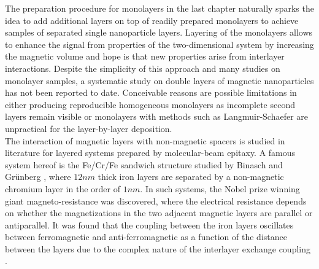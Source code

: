 \documentclass[\main/dresen_thesis.tex]{subfiles}
\begin{document}
  The preparation procedure for monolayers in the last chapter naturally sparks the idea to add additional layers on top of readily prepared monolayers to achieve samples of separated single nanoparticle layers.
  Layering of the monolayers allows to enhance the signal from properties of the two-dimensional system by increasing the magnetic volume and hope is that new properties arise from interlayer interactions.
  Despite the simplicity of this approach and many studies on monolayer samples, a systematic study on double layers of magnetic nanoparticles has not been reported to date.
  Conceivable reasons are possible limitations in either producing reproducible homogeneous monolayers as incomplete second layers remain visible \cite{Mishra_2015_Polar, Bodnarchuk_2010_Large} or monolayers with methods such as Langmuir-Schaefer \cite{Ukleev_2017_Polar} are unpractical for the layer-by-layer deposition.
  \\

  The interaction of magnetic layers with non-magnetic spacers is studied in literature for layered systems prepared by molecular-beam epitaxy.
  A famous system hereof is the Fe/Cr/Fe sandwich structure studied by Binasch and Gr\"unberg \etal \cite{Binasch_1989_Enhan}, where $12 \unit{nm}$ thick iron layers are separated by a non-magnetic chromium layer in the order of  $1 \unit{nm}$.
  In such systems, the Nobel prize winning giant magneto-resistance was discovered, where the electrical resistance depends on whether the magnetizations in the two adjacent magnetic layers are parallel or antiparallel.
  It was found that the coupling between the iron layers oscillates between ferromagnetic and anti-ferromagnetic as a function of the distance between the layers due to the complex nature of the interlayer exchange coupling \cite{Demokritov_1998_Biqua}.
\end{document}

